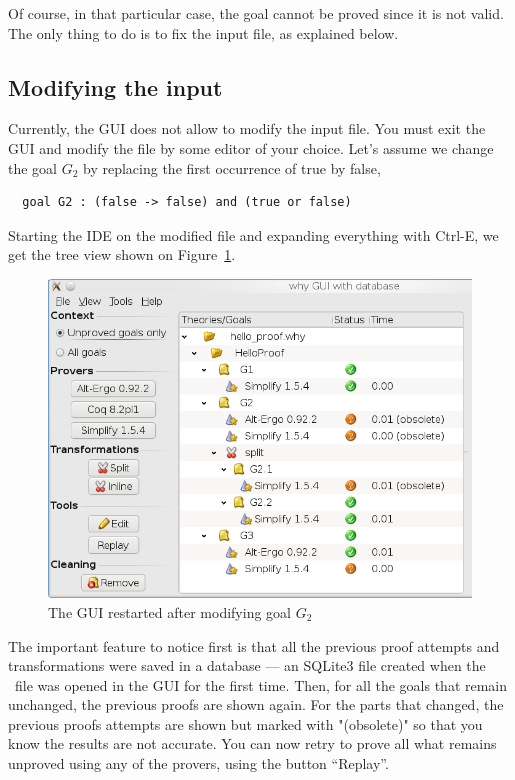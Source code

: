 Of course, in that particular case, the goal cannot be proved since it
is not valid. The only thing to do is to fix the input file, as
explained below.

\subsection{Modifying the input}

Currently, the GUI does not allow to modify the input file. You must
exit the GUI and modify the file by some editor of your choice. Let's assume we change the goal $G_2$ by replacing the first occurrence of true by false, \eg
\begin{verbatim}
  goal G2 : (false -> false) and (true or false)
\end{verbatim}
Starting the IDE on the modified file and expanding everything with
\textsf{Ctrl-E}, we get the tree view shown on Figure~\ref{fig:gui5}.

\begin{figure}[tbp]
  \includegraphics[width=\textwidth]{gui5.png}
  \caption{The GUI restarted after modifying goal $G_2$}
  \label{fig:gui5}
\end{figure}

The important feature to notice first is that all the previous proof
attempts and transformations were saved in a database --- an SQLite3
file created when the \why\ file was opened in the GUI for the first
time. Then, for
all the goals that remain unchanged, the previous proofs are shown
again. For the parts that changed, the previous proofs attempts are
shown but marked with "(obsolete)" so that you know the results are
not accurate. You can now retry to prove all what remains unproved
using any of the provers, using the button ``Replay''.

